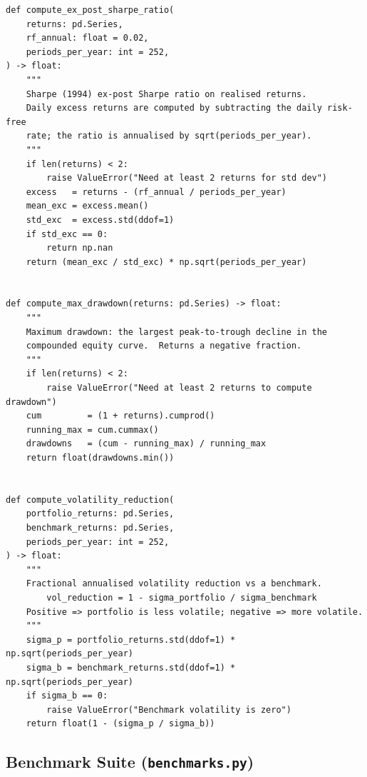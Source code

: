 \documentclass[a4paper]{report}
\begin{document}
\begin{Verbatim}[fontsize=\footnotesize, baselinestretch=0.85]
def compute_ex_post_sharpe_ratio(
    returns: pd.Series,
    rf_annual: float = 0.02,
    periods_per_year: int = 252,
) -> float:
    """
    Sharpe (1994) ex-post Sharpe ratio on realised returns.
    Daily excess returns are computed by subtracting the daily risk-free
    rate; the ratio is annualised by sqrt(periods_per_year).
    """
    if len(returns) < 2:
        raise ValueError("Need at least 2 returns for std dev")
    excess   = returns - (rf_annual / periods_per_year)
    mean_exc = excess.mean()
    std_exc  = excess.std(ddof=1)
    if std_exc == 0:
        return np.nan
    return (mean_exc / std_exc) * np.sqrt(periods_per_year)


def compute_max_drawdown(returns: pd.Series) -> float:
    """
    Maximum drawdown: the largest peak-to-trough decline in the
    compounded equity curve.  Returns a negative fraction.
    """
    if len(returns) < 2:
        raise ValueError("Need at least 2 returns to compute drawdown")
    cum         = (1 + returns).cumprod()
    running_max = cum.cummax()
    drawdowns   = (cum - running_max) / running_max
    return float(drawdowns.min())


def compute_volatility_reduction(
    portfolio_returns: pd.Series,
    benchmark_returns: pd.Series,
    periods_per_year: int = 252,
) -> float:
    """
    Fractional annualised volatility reduction vs a benchmark.
        vol_reduction = 1 - sigma_portfolio / sigma_benchmark
    Positive => portfolio is less volatile; negative => more volatile.
    """
    sigma_p = portfolio_returns.std(ddof=1) * np.sqrt(periods_per_year)
    sigma_b = benchmark_returns.std(ddof=1) * np.sqrt(periods_per_year)
    if sigma_b == 0:
        raise ValueError("Benchmark volatility is zero")
    return float(1 - (sigma_p / sigma_b))
\end{Verbatim}

\subsection{Benchmark Suite (\texttt{benchmarks.py})}
\end{document}
